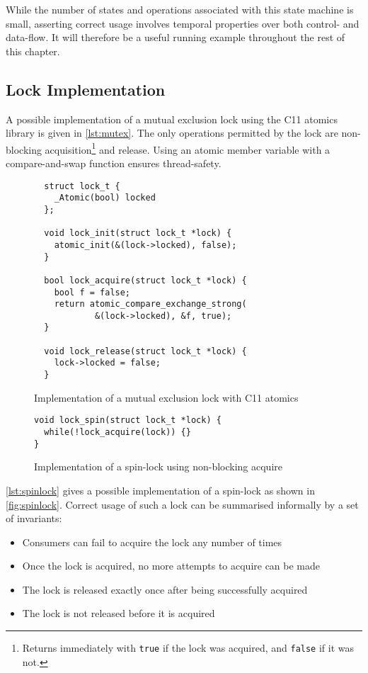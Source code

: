While the number of states and operations associated with this state machine is
small, asserting correct usage involves temporal properties over both control-
and data-flow. It will therefore be a useful running example throughout the rest
of this chapter.

\subsection{Lock Implementation}

A possible implementation of a mutual exclusion lock using the C11
atomics library is given in \autoref{lst:mutex}. The only operations
permitted by the lock are non-blocking acquisition\footnote{Returns immediately
with \texttt{true} if the lock was acquired, and
\texttt{false} if it was not.} and release. Using an atomic
member variable with a compare-and-swap function ensures thread-safety.

\begin{figure}
  \begin{verbatim}
  struct lock_t {
    _Atomic(bool) locked
  };

  void lock_init(struct lock_t *lock) {
    atomic_init(&(lock->locked), false);
  }

  bool lock_acquire(struct lock_t *lock) {
    bool f = false;
    return atomic_compare_exchange_strong(
            &(lock->locked), &f, true);
  }

  void lock_release(struct lock_t *lock) {
    lock->locked = false;
  }
  \end{verbatim}
  \caption{Implementation of a mutual exclusion lock with C11 atomics}
  \label{lst:mutex}
\end{figure}

\begin{figure}
  \begin{verbatim}
void lock_spin(struct lock_t *lock) {
  while(!lock_acquire(lock)) {}
}
  \end{verbatim}
  \caption{Implementation of a spin-lock using non-blocking acquire}
  \label{lst:spinlock}
\end{figure}

\autoref{lst:spinlock} gives a possible implementation of a spin-lock as shown
in \autoref{fig:spinlock}.
Correct usage of such a lock can be summarised informally by a set of
invariants:
\begin{itemize}
  \item Consumers can fail to acquire the lock any number of times
  \item Once the lock is acquired, no more attempts to acquire can be made
  \item The lock is released exactly once after being successfully acquired
  \item The lock is not released before it is acquired
\end{itemize}


